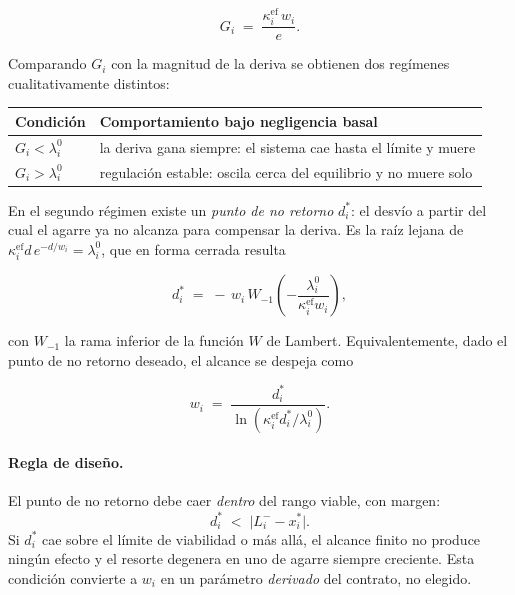 \documentclass[11pt,a4paper]{article}
\begin{document}
\begin{equation}
  G_i \;=\; \frac{\kappa_i^{\mathrm{ef}}\, w_i}{e} .
\end{equation}

Comparando $G_i$ con la magnitud de la deriva se obtienen dos regímenes cualitativamente
distintos:

\begin{center}
\begin{tabular}{ll}
\toprule
\textbf{Condición} & \textbf{Comportamiento bajo negligencia basal}\\
\midrule
$G_i < \lambda_i^{0}$ & la deriva gana siempre: el sistema cae hasta el límite y muere\\
$G_i > \lambda_i^{0}$ & regulación estable: oscila cerca del equilibrio y no muere solo\\
\bottomrule
\end{tabular}
\end{center}

En el segundo régimen existe un \emph{punto de no retorno} $d_i^{*}$: el desvío a partir
del cual el agarre ya no alcanza para compensar la deriva. Es la raíz lejana de
$\kappa_i^{\mathrm{ef}} d\, e^{-d/w_i} = \lambda_i^{0}$, que en forma cerrada resulta

\begin{equation}
  d_i^{*} \;=\; -\,w_i\, W_{-1}\!\left(-\frac{\lambda_i^{0}}{\kappa_i^{\mathrm{ef}} w_i}\right),
  \label{eq:dstar}
\end{equation}

con $W_{-1}$ la rama inferior de la función $W$ de Lambert. Equivalentemente, dado el
punto de no retorno deseado, el alcance se despeja como

\begin{equation}
  w_i \;=\; \frac{d_i^{*}}{\ln\!\left(\kappa_i^{\mathrm{ef}} d_i^{*} / \lambda_i^{0}\right)} .
  \label{eq:w}
\end{equation}

\paragraph{Regla de diseño.} El punto de no retorno debe caer \emph{dentro} del rango
viable, con margen:
\begin{equation}
  d_i^{*} \;<\; \big|L_i^{-} - x_i^{*}\big| .
\end{equation}
Si $d_i^{*}$ cae sobre el límite de viabilidad o más allá, el alcance finito no produce
ningún efecto y el resorte degenera en uno de agarre siempre creciente. Esta condición
convierte a $w_i$ en un parámetro \emph{derivado} del contrato, no elegido.
\end{document}
